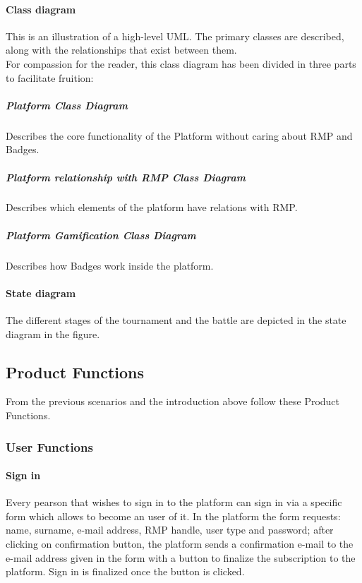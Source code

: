 \paragraph{Class diagram}
This is an illustration of a high-level UML. The primary classes are described, along with the relationships that exist between them.
\\For compassion for the reader, this class diagram has been divided in three parts to facilitate fruition:
\newpage
\subparagraph{Platform Class Diagram}
Describes the core functionality of the Platform without caring about RMP and Badges.\\
\newpage
\subparagraph{Platform relationship with RMP Class Diagram}
Describes which elements of the platform have relations with RMP.\\
\subparagraph{Platform Gamification Class Diagram}
Describes how Badges work inside the platform.\\
\newpage 

\paragraph{State diagram}
The different stages of the tournament and the battle are depicted in the state diagram in the figure.

\newpage

\subsection{Product Functions}
From the previous scenarios and the introduction above follow these Product Functions.

\subsubsection{User Functions}

\paragraph{Sign in}
Every pearson that wishes to sign in to the platform can sign in via a specific form which allows to become an user of it.
In the platform the form requests: name, surname, e-mail address, RMP handle, user type and password; after clicking on confirmation button, the platform sends a confirmation e-mail to the e-mail address given in the form with a button to finalize the subscription to the platform. Sign in is finalized once the button is clicked.
